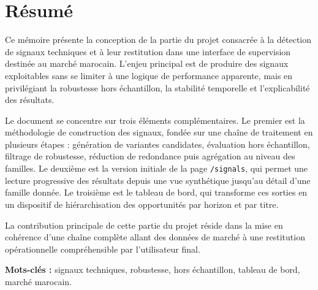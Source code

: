 ﻿\chapter*{Résumé}

Ce mémoire présente la conception de la partie du projet consacrée à la
détection de signaux techniques et à leur restitution dans une interface de
supervision destinée au marché marocain. L'enjeu principal est de produire des
signaux exploitables sans se limiter à une logique de performance apparente,
mais en privilégiant la robustesse hors échantillon, la stabilité temporelle et
l'explicabilité des résultats.

Le document se concentre sur trois éléments complémentaires. Le premier est la
méthodologie de construction des signaux, fondée sur une chaîne de traitement en
plusieurs étapes : génération de variantes candidates, évaluation hors
échantillon, filtrage de robustesse, réduction de redondance puis agrégation au
niveau des familles. Le deuxième est la version initiale de la page
\texttt{/signals}, qui permet une lecture progressive des résultats depuis une
vue synthétique jusqu'au détail d'une famille donnée. Le troisième est le
tableau de bord, qui transforme ces sorties en un dispositif de hiérarchisation
des opportunités par horizon et par titre.

La contribution principale de cette partie du projet réside dans la mise en
cohérence d'une chaîne complète allant des données de marché à une restitution
opérationnelle compréhensible par l'utilisateur final.

\textbf{Mots-clés :} signaux techniques, robustesse, hors échantillon, tableau
de bord, marché marocain.

\cleardoublepage

